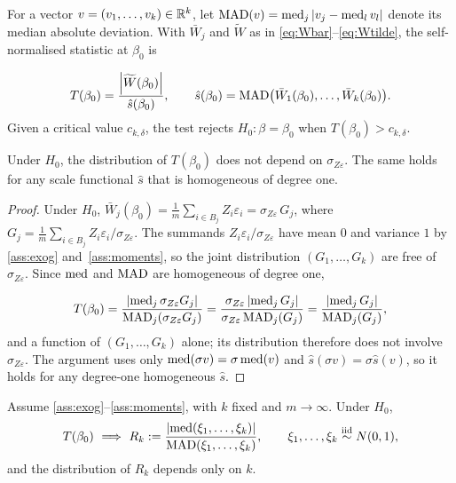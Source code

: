 \begin{definition}
\label{def:sn_stat}
  For a vector $v=(v_1,\dots,v_k)\in\mathbb{R}^k$, let $\operatorname{MAD}(v)=\operatorname{med}_{j}\left|v_j-\operatorname{med}_{l}v_l\right|$ denote its median absolute deviation. With $\bar{W}_j$ and $\widetilde{W}$ as in \eqref{eq:Wbar}--\eqref{eq:Wtilde}, the self-normalised statistic at $\beta_0$ is
 
    \[
        T(\beta_0)=\frac{\left|\widetilde{W}(\beta_0)\right|}{\hat{s}(\beta_0)},
        \qquad
        \hat{s}(\beta_0)=\operatorname{MAD}\bigl(\bar{W}_1(\beta_0),\dots,\bar{W}_k(\beta_0)\bigr).
    \]
Given a critical value $c_{k,\delta}$, the test rejects $H_0\colon\beta=\beta_0$ when $T(\beta_0)>c_{k,\delta}$.
\end{definition}

\begin{proposition}

\label{prop:scale_invariance}
Under $H_0$, the distribution of $T(\beta_0)$ does not depend on $\sigma_{Z\varepsilon}$. The same holds for any scale functional $\hat{s}$ that is homogeneous of degree one.
\end{proposition}

\begin{proof}

    Under $H_0$, $\bar{W}_j(\beta_0)=\tfrac1m\sum_{i\in B_j}Z_i\varepsilon_i =\sigma_{Z\varepsilon}\,G_j$, where $G_j=\tfrac1m\sum_{i\in B_j}Z_i\varepsilon_i/\sigma_{Z\varepsilon}$. The summands $Z_i\varepsilon_i/\sigma_{Z\varepsilon}$ have mean $0$ and variance $1$ by \ref{ass:exog} and~\ref{ass:moments}, so the joint distribution $(G_1,\dots,G_k)$ are free of $\sigma_{Z\varepsilon}$. Since $\operatorname{med}$ and $\operatorname{MAD}$ are homogeneous of degree one,

    \[
        T(\beta_0) =\frac{\left|\operatorname{med}_j \sigma_{Z\varepsilon}G_j\right|}{\operatorname{MAD}_j(\sigma_{Z\varepsilon}G_j)} =\frac{\sigma_{Z\varepsilon}\left|\operatorname{med}_j G_j\right|}{\sigma_{Z\varepsilon}\operatorname{MAD}_j(G_j)} =\frac{\left|\operatorname{med}_j G_j\right|}{\operatorname{MAD}_j(G_j)},
    \]
    and a function of $(G_1,\dots,G_k)$ alone; its distribution therefore does not involve $\sigma_{Z\varepsilon}$. The argument uses only $\operatorname{med}(\sigma v)=\sigma\operatorname{med}(v)$ and $\hat{s}(\sigma v)=\sigma\hat{s}(v)$, so it holds for any degree-one homogeneous $\hat{s}$.
\end{proof}

\begin{proposition}

\label{prop:sn_pivotal}
    Assume \ref{ass:exog}--\ref{ass:moments}, with $k$ fixed and $m\to\infty$. Under $H_0$,
    \[
        T(\beta_0)\ \Longrightarrow\ R_k:=\frac{\abs{\med(\xi_1,\dots,\xi_k)}}{\MAD(\xi_1,\dots,\xi_k)}, \qquad \xi_1,\dots,\xi_k\overset{\text{iid}}{\sim}N(0,1),
    \]
    and the distribution of $R_k$ depends only on $k$.

\end{proposition}

